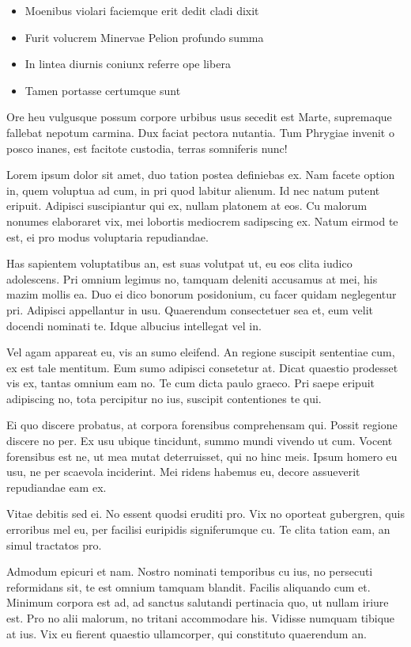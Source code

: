 \documentclass[11pt,]{book}
\providecommand{\tightlist}{%
  \setlength{\itemsep}{0pt}\setlength{\parskip}{0pt}}
\begin{document}
\begin{itemize}
\tightlist
\item
  Moenibus violari faciemque erit dedit cladi dixit
\item
  Furit volucrem Minervae Pelion profundo summa
\item
  In lintea diurnis coniunx referre ope libera
\item
  Tamen portasse certumque sunt
\end{itemize}

Ore heu vulgusque possum corpore urbibus usus secedit est Marte,
supremaque fallebat nepotum carmina. Dux faciat pectora nutantia. Tum
Phrygiae invenit o posco inanes, est facitote custodia, terras
somniferis nunc!

Lorem ipsum dolor sit amet, duo tation postea definiebas ex. Nam facete
option in, quem voluptua ad cum, in pri quod labitur alienum. Id nec
natum putent eripuit. Adipisci suscipiantur qui ex, nullam platonem at
eos. Cu malorum nonumes elaboraret vix, mei lobortis mediocrem
sadipscing ex. Natum eirmod te est, ei pro modus voluptaria repudiandae.

Has sapientem voluptatibus an, est suas volutpat ut, eu eos clita iudico
adolescens. Pri omnium legimus no, tamquam deleniti accusamus at mei,
his mazim mollis ea. Duo ei dico bonorum posidonium, cu facer quidam
neglegentur pri. Adipisci appellantur in usu. Quaerendum consectetuer
sea et, eum velit docendi nominati te. Idque albucius intellegat vel in.

Vel agam appareat eu, vis an sumo eleifend. An regione suscipit
sententiae cum, ex est tale mentitum. Eum sumo adipisci consetetur at.
Dicat quaestio prodesset vis ex, tantas omnium eam no. Te cum dicta
paulo graeco. Pri saepe eripuit adipiscing no, tota percipitur no ius,
suscipit contentiones te qui.

Ei quo discere probatus, at corpora forensibus comprehensam qui. Possit
regione discere no per. Ex usu ubique tincidunt, summo mundi vivendo ut
cum. Vocent forensibus est ne, ut mea mutat deterruisset, qui no hinc
meis. Ipsum homero eu usu, ne per scaevola inciderint. Mei ridens
habemus eu, decore assueverit repudiandae eam ex.

Vitae debitis sed ei. No essent quodsi eruditi pro. Vix no oporteat
gubergren, quis erroribus mel eu, per facilisi euripidis signiferumque
cu. Te clita tation eam, an simul tractatos pro.

Admodum epicuri et nam. Nostro nominati temporibus cu ius, no persecuti
reformidans sit, te est omnium tamquam blandit. Facilis aliquando cum
et. Minimum corpora est ad, ad sanctus salutandi pertinacia quo, ut
nullam iriure est. Pro no alii malorum, no tritani accommodare his.
Vidisse numquam tibique at ius. Vix eu fierent quaestio ullamcorper, qui
constituto quaerendum an.
\end{document}
